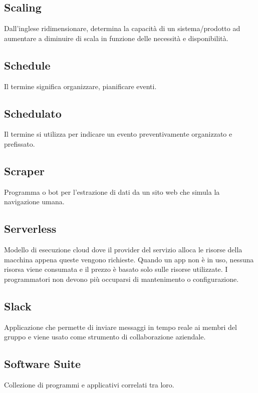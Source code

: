 \documentclass{classes/base}
\begin{document}
        \subsection*{Scaling}       
        Dall'inglese ridimensionare, determina la capacità di un sistema/prodotto ad aumentare a diminuire di scala in funzione delle necessità e disponibilità.

        \subsection*{Schedule} 
        Il termine significa organizzare, pianificare eventi.

        \subsection*{Schedulato}
        Il termine si utilizza per indicare un evento preventivamente organizzato e prefissato.
        
        \subsection*{Scraper}
        Programma o bot per l'estrazione di dati da un sito web che simula la navigazione umana.
        
        \subsection*{Serverless}
        Modello di esecuzione cloud dove il provider del servizio alloca le risorse della macchina appena queste vengono richieste. Quando un app non è in uso, nessuna risorsa viene consumata e il prezzo è basato solo sulle risorse utilizzate. I programmatori non devono più occuparsi di mantenimento o configurazione.

        \subsection*{Slack} 
        Applicazione che permette di inviare messaggi in tempo reale ai membri del gruppo e viene usato come strumento di collaborazione aziendale.

        \subsection*{Software Suite} 
        Collezione di programmi e applicativi correlati tra loro.
        
\end{document}
